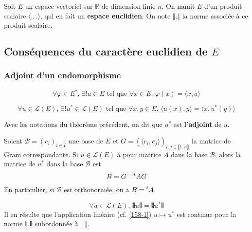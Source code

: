 



  Soit $E$ un espace vectoriel sur $\mathbb{R}$ de dimension finie $n$. On munit $E$ d'un produit scalaire $\langle . , . \rangle$, qui en fait un \textbf{espace euclidien}. On note $\Vert . \Vert$ la norme associée à ce produit scalaire.

  \subsection{Conséquences du caractère euclidien de \texorpdfstring{$E$}{E}}

  \subsubsection{Adjoint d'un endomorphisme}


  \begin{lemma}
    \[ \forall \varphi \in E^*, \, \exists! a \in E \text{ tel que } \forall x \in E, \, \varphi(x) = \langle x, a \rangle \]
  \end{lemma}

  \begin{theorem}
    \[ \forall u \in \mathcal{L}(E), \, \exists! u^* \in \mathcal{L}(E) \text{ tel que } \forall x, y \in E, \, \langle u(x), y \rangle = \langle x, u^*(y) \rangle \]
  \end{theorem}

  \begin{definition}
    Avec les notations du théorème précédent, on dit que $u^*$ est \textbf{l'adjoint} de $u$.
  \end{definition}

  \begin{theorem}
    Soient $\mathcal{B} = (e_i)_{i \in I}$ une base de $E$ et $G = (\langle e_i, e_j \rangle)_{i,j \in \llbracket 1, n \rrbracket}$ la matrice de Gram correspondante. Si $u \in \mathcal{L}(E)$ a pour matrice $A$ dans la base $\mathcal{B}$, alors la matrice de $u^*$ dans la base $\mathcal{B}$ est
    \[ B = G^{-1} \mathstrut ^t A G \]
    En particulier, si $\mathcal{B}$ est orthonormée, on a $B = \mathstrut ^t A$.
  \end{theorem}


  \begin{proposition}
    \[ \forall u \in \mathcal{L}(E), \, \VERT u \VERT = \VERT u^* \VERT \]
    Il en résulte que l'application linéaire (cf. \cref{158-1}) $u \mapsto u^*$ est continue pour la norme $\VERT . \VERT$ subordonnée à $\Vert . \Vert$.
  \end{proposition}


